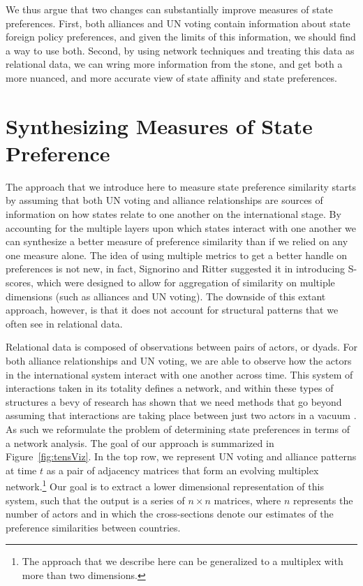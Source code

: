 \documentclass[12pt,pdflatex]{elsarticle}
\begin{document}
We thus argue that two changes can substantially improve measures of state preferences. First, both alliances and UN voting contain information about state foreign policy preferences, and given the limits of this information, we should find a way to use both. Second, by using network techniques and treating this data as relational data, we can wring more information from the stone, and get both a more nuanced, and more accurate view of state affinity and state preferences.

\section*{Synthesizing Measures of State Preference}

The approach that we introduce here to measure state preference similarity starts by assuming that both UN voting and alliance relationships are sources of information on how states relate to one another on the international stage. By accounting for the multiple layers upon which states interact with one another we can synthesize a better measure of preference similarity than if we relied on any one measure alone. The idea of using multiple metrics to get a better handle on preferences is not new, in fact, Signorino and Ritter suggested it in introducing S-scores, which were designed to allow for aggregation of similarity on multiple dimensions (such as alliances and UN voting). The downside of this extant approach, however, is that it does not account for structural patterns that we often see in relational data.

Relational data is composed of observations between pairs of actors, or dyads. For both alliance relationships and UN voting, we are able to observe how the actors in the international system interact with one another across time. This system of interactions taken in its totality defines a network, and within these types of structures a bevy of research has shown that we need methods that go beyond assuming that interactions are taking place between just two actors in a vacuum \citep{wasserman:faust:1994,snijders:nowicki:1997,minhas:etal:2019}. As such we reformulate the problem of determining state preferences in terms of a network analysis. The goal of our approach is summarized in Figure~\ref{fig:tensViz}. In the top row, we represent UN voting and alliance patterns at time $t$ as a pair of adjacency matrices that form an evolving multiplex network.\footnote{The approach that we describe here can be generalized to a multiplex with more than two dimensions.} Our goal is to extract a lower dimensional representation of this system, such that the output is a series of $n \times n$ matrices, where $n$ represents the number of actors and in which the cross-sections denote our estimates of the preference similarities between countries.
\end{document}
